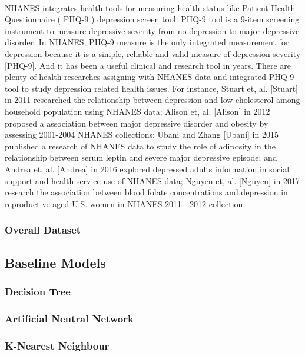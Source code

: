 \documentclass[runningheads]{llncs}
\begin{document}
\paragraph{}
NHANES integrates health tools for measuring health status like Patient Health Questionnaire ( PHQ-9 ) depression screen tool. PHQ-9 tool is a 9-item screening instrument to measure depressive severity from no depression to major depressive disorder. In NHANES, PHQ-9 measure is the only integrated measurement for depression because it is a simple, reliable and valid measure of depression severity [PHQ-9]. And it has been a useful clinical and research tool in years. There are plenty of health researches assigning with NHANES data and integrated PHQ-9 tool to study depression related health issues. For instance, Stuart et, al. [Stuart] in 2011 researched the relationship between depression and low cholesterol among household population using NHANES data; Alison et, al. [Alison] in 2012 proposed a association between major depressive disorder and obesity by assessing 2001-2004 NHANES collections; Ubani and Zhang [Ubani] in 2015 published a research of NHANES data to study the role of adiposity in the relationship between serum leptin and severe major depressive episode; and Andrea et, al. [Andrea] in 2016 explored depressed adults information in social support and health service use of NHANES data; Nguyen et, al. [Nguyen] in 2017 research the association between blood folate concentrations and depression in reproductive aged U.S. women in NHANES 2011 - 2012 collection.

%
%
%
%
%
\subsubsection{Overall Dataset}
\paragraph{}
%
%
%
%
%
%
\subsection{Baseline Models}
%
%
\subsubsection{Decision Tree}
%
%
\subsubsection{Artificial Neutral Network}
%
%
\subsubsection{K-Nearest Neighbour}
%
%
\end{document}

